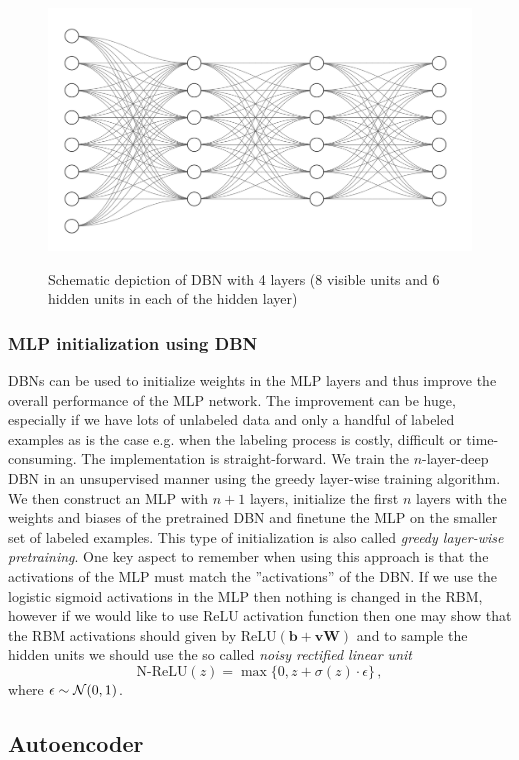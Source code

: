 \documentclass{myclass}
\begin{document}
\begin{figure}[ht]
   \centering
   \includegraphics[width=0.85\columnwidth]{figs/dbn.png}
   \label{fig:dbn}
   \caption{Schematic depiction of DBN with 4 layers (8 visible units and 6 hidden units in each of the hidden layer)}
\end{figure}


\subsubsection{MLP initialization using DBN}

DBNs can be used to initialize weights in the MLP layers and thus improve the overall performance of
the MLP network. The improvement can be huge, especially if we have lots of unlabeled data and only
a handful of labeled examples as is the case e.g. when the labeling process is costly, difficult or
time-consuming. The implementation is straight-forward. We train the $n$-layer-deep DBN in an
unsupervised manner using the greedy layer-wise training algorithm. We then construct an MLP with
$n+1$ layers, initialize the first $n$ layers with the weights and biases of the pretrained DBN and
finetune the MLP on the smaller set of labeled examples. This type of initialization is also called
\emph{greedy layer-wise pretraining}. One key aspect to remember when using this approach is that
the activations of the MLP must match the ''activations'' of the DBN. If we use the logistic sigmoid
activations in the MLP then nothing is changed in the RBM, however if we would like to use ReLU
activation function then one may show that the RBM activations should given by $\text{ReLU}(\bm{b} +
\bm{vW})$ and to sample the hidden units we should use the so called \emph{noisy rectified linear
unit} 
\[
   \text{N-ReLU}(z) = \max\{ 0, z + \sigma(z) \cdot \epsilon\}\,,
\]
where $\epsilon \sim \mathcal{N}(0,1)$.


\subsection{Autoencoder}
\end{document}
